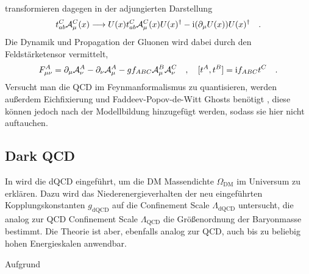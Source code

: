     transformieren dagegen in der 
    adjungierten Darstellung \cite{Weinberg:QFT_2}
    \begin{equation}
      t^C_{ab}\mathcal{A}_\mu^C(x) \longrightarrow
      U(x) t^C_{ab}\mathcal{A}_\mu^C(x) U(x)^\dagger - \text{i} (\partial_\mu U(x) )
      U(x)^\dagger \quad .
    \end{equation}
    Die Dynamik und Propagation der Gluonen wird dabei durch den 
    Feldstärketensor vermittelt,
    \begin{equation}
      F^A_{\mu\nu} = \partial_\mu \mathcal{A}_\nu^A-\partial_\nu 
      \mathcal{A}_\mu^A - g f_{ABC} \mathcal{A}_\mu^B \mathcal{A}_\nu^C 
      \quad , \quad [t^A,t^B]=\text{i} f_{ABC} t^C  \quad .
    \end{equation}
    Versucht man die QCD im Feynmanformalismus zu quantisieren, werden außerdem 
    Eichfixierung und Faddeev-Popov-de-Witt Ghosts benötigt  
    \cite{Weinberg:QFT_2}, diese können jedoch nach der Modellbildung 
    hinzugefügt werden, sodass sie hier nicht auftauchen. 
    
    
  \subsection{Dark QCD}
    In \cite{Scale_of_dark_QCD} wird die dQCD eingeführt, um die DM Massendichte 
    $\Omega_\text{DM}$ im Universum zu erklären. Dazu wird das 
    Niederenergieverhalten der neu eingeführten Kopplungskonstanten 
    $g_\text{dQCD}$ auf die Confinement Scale $\Lambda_\text{dQCD}$ untersucht, 
    die analog zur QCD Confinement Scale $\Lambda_\text{QCD}$ die Größenordnung 
    der Baryonmasse bestimmt. Die Theorie ist aber, ebenfalls analog zur QCD, 
    auch bis zu beliebig hohen Energieskalen anwendbar.
    
    

    
  
  
  
  Aufgrund\cite{Ade:2015xua}